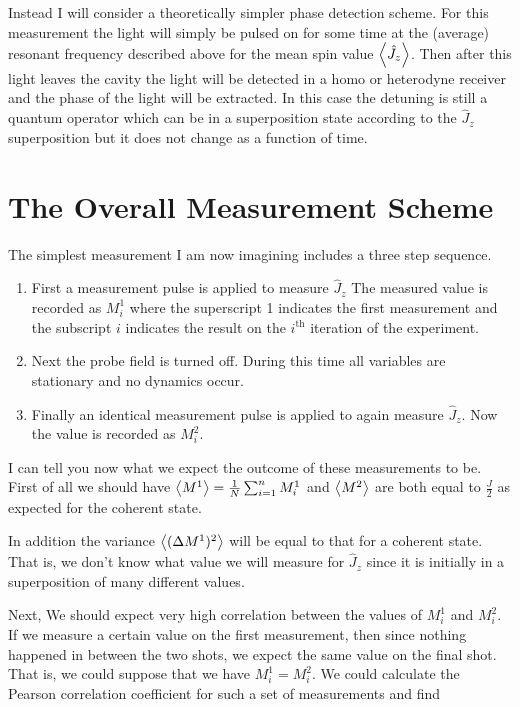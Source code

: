 \documentclass[12pt]{article}
\begin{document}
Instead I will consider a theoretically simpler phase detection scheme. For this measurement the light will simply be pulsed on for some time at the (average) resonant frequency described above for the mean spin value $\Braket{\hat{J}_z}$. Then after this light leaves the cavity the light will be detected in a homo or heterodyne receiver and the phase of the light will be extracted. In this case the detuning is still a quantum operator which can be in a superposition state according to the $\hat{J}_z$ superposition but it does not change as a function of time.

\section{The Overall Measurement Scheme}

The simplest measurement I am now imagining includes a three step sequence.

\begin{enumerate}
	\item{First a measurement pulse is applied to measure $\hat{J}_z$ The measured value is recorded as $M^1_i$ where the superscript 1 indicates the first measurement and the subscript $i$ indicates the result on the $i^{\text{th}}$ iteration of the experiment.}
	\item{Next the probe field is turned off. During this time all variables are stationary and no dynamics occur.}
	\item{Finally an identical measurement pulse is applied to again measure $\hat{J}_z$. Now the value is recorded as $M^2_i$.}
\end{enumerate}

I can tell you now what we expect the outcome of these measurements to be. First of all we should have $\Braket{M^1} = \frac{1}{N}\sum_{i = 1}^n M^1_i$ and $\Braket{M^2}$ are both equal to $\frac{J}{2}$ as expected for the coherent state.

In addition the variance $\Braket{(\Delta M^1)^2}$ will be equal to that for a coherent state. That is, we don't know what value we will measure for $\hat{J}_z$ since it is initially in a superposition of many different values. 

Next, We should expect very high correlation between the values of $M^1_i$ and $M^2_i$. If we measure a certain value on the first measurement, then since nothing happened in between the two shots, we expect the same value on the final shot. That is, we could suppose that we have $M^1_i = M^2_i$. We could calculate the Pearson correlation coefficient for such a set of measurements and find
\end{document}
